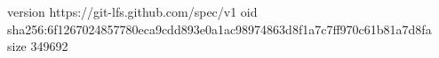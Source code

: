 version https://git-lfs.github.com/spec/v1
oid sha256:6f1267024857780eca9cdd893e0a1ac98974863d8f1a7c7ff970c61b81a7d8fa
size 349692
